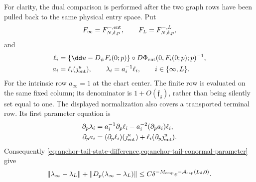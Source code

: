 \begin{lemma}
For clarity, the dual comparison is performed after the two graph rows
have been pulled back to the same physical entry space.  Put
\[
 F_\infty=F^{-,\rm ent}_{N,\delta,p},
 \qquad F_L=F^{-,L}_{N,\delta,p},
\]
and
\begin{align}
 \ell_i
 &=\{\dd u-D_\psi F_i(0;p)\}
       \circ D\Phi_{\rm ent}(0,F_i(0;p);p)^{-1},\notag\\
 a_i&=\ell_i(\jmath_{\rm ent}^u),\qquad
 \lambda_i=a_i^{-1}\ell_i,\qquad i\in\{\infty,L\}.
                                                        \label{eq:anchor-tail-conormal-normalization}
\end{align}
For the intrinsic row \(a_\infty=1\) at the chart center.  The finite row
is evaluated on the same fixed column; its denominator is
\(1+O(\mathfrak f_\delta)\), rather than being silently set equal to one.
The displayed normalization also covers a transported terminal row.  Its
first parameter equation is
\begin{align}
 \partial_p\lambda_i
 &=a_i^{-1}\partial_p\ell_i
   -a_i^{-2}(\partial_pa_i)\ell_i,\notag\\
 \partial_pa_i
 &=(\partial_p\ell_i)(\jmath_{\rm ent}^u)
   +\ell_i(\partial_p\jmath_{\rm ent}^u).          \label{eq:anchor-tail-conormal-parameter}
\end{align}
Consequently
\cref{eq:anchor-tail-state-difference,eq:anchor-tail-conormal-parameter}
give
\begin{equation}
 \|\lambda_\infty-\lambda_L\|
 +\|D_p(\lambda_\infty-\lambda_L)\|
 \le C\delta^{-M_{\rm cmp}}
       e^{-\mathcal A_{\rm cap}(L_\delta,0)}.         \label{eq:anchor-tail-conormal-difference}
\end{equation}


\end{lemma}
